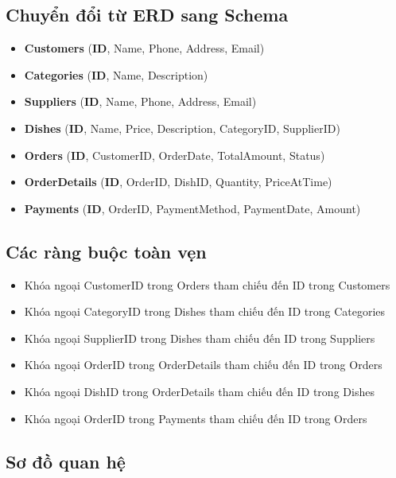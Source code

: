 \documentclass{article}
\begin{document}
\subsection{Chuyển đổi từ ERD sang Schema}
\begin{itemize}
    \item \textbf{Customers} (\textbf{ID}, Name, Phone, Address, Email)
    \item \textbf{Categories} (\textbf{ID}, Name, Description)
    \item \textbf{Suppliers} (\textbf{ID}, Name, Phone, Address, Email)
    \item \textbf{Dishes} (\textbf{ID}, Name, Price, Description, CategoryID, SupplierID)
    \item \textbf{Orders} (\textbf{ID}, CustomerID, OrderDate, TotalAmount, Status)
    \item \textbf{OrderDetails} (\textbf{ID}, OrderID, DishID, Quantity, PriceAtTime)
    \item \textbf{Payments} (\textbf{ID}, OrderID, PaymentMethod, PaymentDate, Amount)
\end{itemize}
\subsection{Các ràng buộc toàn vẹn}

\begin{itemize}
    \item Khóa ngoại CustomerID trong Orders tham chiếu đến ID trong Customers
    \item Khóa ngoại CategoryID trong Dishes tham chiếu đến ID trong Categories
    \item Khóa ngoại SupplierID trong Dishes tham chiếu đến ID trong Suppliers
    \item Khóa ngoại OrderID trong OrderDetails tham chiếu đến ID trong Orders
    \item Khóa ngoại DishID trong OrderDetails tham chiếu đến ID trong Dishes
    \item Khóa ngoại OrderID trong Payments tham chiếu đến ID trong Orders
\end{itemize}

\subsection{Sơ đồ quan hệ}
\end{document}
